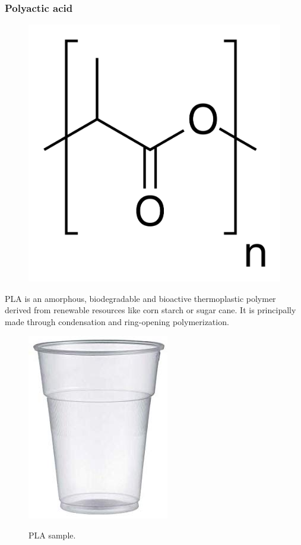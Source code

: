 \documentclass[a4paper, 11pt]{article}
\begin{document}
\subsubsection{Polyactic acid}

\begin{figure}[htp]
	\centering
	{\includegraphics[scale=0.05]{pla_chem}}
	\captionsetup{justification=centering}
	\label{fig:PE}
\end{figure}
PLA is an amorphous, biodegradable and bioactive thermoplastic polymer derived from renewable resources like corn starch or sugar cane. It is principally made through condensation and ring-opening polymerization.

\begin{figure}[h!]
	\centering
	{\includegraphics[scale=0.18]{PLA}}
	\captionsetup{justification=centering}
	\caption{PLA sample.}
	\label{fig:PLA}
\end{figure}
 
\end{document}
